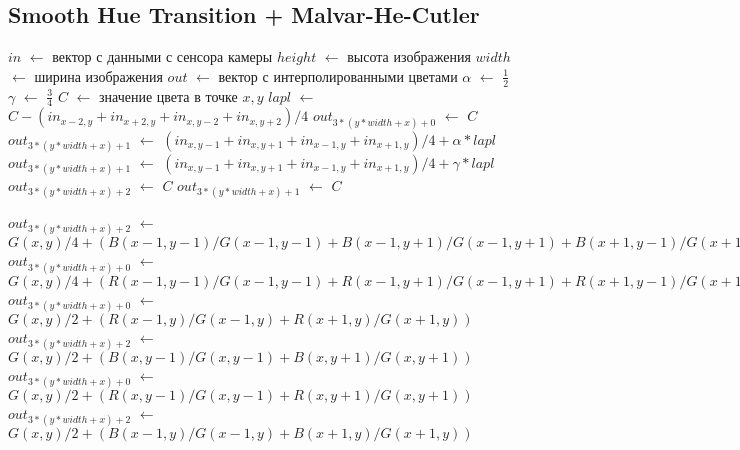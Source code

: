 \subsection{Smooth Hue Transition + Malvar-He-Cutler}
\begin{algorithm}[H]
	\caption{Smooth Hue Transition + Malvar-He-Cutler}
	\label{alg:mhc1}
	\begin{algorithmic}[1]
		\State $in$ $\gets$ вектор с данными с сенсора камеры
		\State $height$ $\gets$ высота изображения
		\State $width$ $\gets$ ширина изображения
		\State $out$ $\gets$ вектор с интерполированными цветами
		\State $\alpha$ $\gets$ $\frac{1}{2}$
		\State $\gamma$ $\gets$ $\frac{3}{4}$
		\State $C$ $\gets$ значение цвета в точке $x,y$
		\State $lapl$ $\gets$ $C - (in_{x-2, y} + in_{x+2, y} + in_{x, y-2} + in_{x, y+2}) / 4$
		\State $out_{3 * (y * width + x) + 0}$ $\gets$ $C$
		\State $out_{3 * (y * width + x) + 1}$ $\gets$ $(in_{x, y-1} + in_{x, y + 1} + in_{x - 1, y} + in_{x + 1, y}) / 4 + \alpha * lapl$
		\EndIf
		\State $out_{3 * (y * width + x) + 1}$ $\gets$ $(in_{x, y-1} + in_{x, y + 1} + in_{x - 1, y} + in_{x + 1, y}) / 4 + \gamma * lapl$
		\State $out_{3 * (y * width + x) + 2}$ $\gets$ $C$
		\EndIf
		\State $out_{3 * (y * width + x) + 1}$ $\gets$ $C$
		\EndIf
		\EndFor
		\EndFor
	\end{algorithmic}
\end{algorithm}
\clearpage
\begin{algorithm}
	\begin{algorithmic}[1]
		\State $out_{3 * (y * width + x) + 2}$ $\gets$ $G(x,y)/4 + (
		B(x-1,y-1)/G(x-1,y-1) +
		B(x-1,y+1)/G(x-1,y+1) +
		B(x+1,y-1)/G(x+1,y-1) +
		B(x+1,y+1)/G(x+1,y+1)
		)$
		\EndIf
		\State $out_{3 * (y * width + x) + 0}$ $\gets$ $G(x,y)/4 + (
		R(x-1,y-1)/G(x-1,y-1) +
		R(x-1,y+1)/G(x-1,y+1) +
		R(x+1,y-1)/G(x+1,y-1) +
		R(x+1,y+1)/G(x+1,y+1)
		)$
		\EndIf
		\State $out_{3 * (y * width + x) + 0}$ $\gets$ $G(x,y)/2 + (
		R(x-1,y)/G(x-1,y) +
		R(x+1,y)/G(x+1,y)
		)$
		\State $out_{3 * (y * width + x) + 2}$ $\gets$ $G(x,y)/2 + (
		B(x,y-1)/G(x,y-1) +
		B(x,y+1)/G(x,y+1)
		)$
		\EndIf
		\State $out_{3 * (y * width + x) + 0}$ $\gets$ $G(x,y)/2 + (
		R(x,y-1)/G(x,y-1) +
		R(x,y+1)/G(x,y+1)
		)$
		\State $out_{3 * (y * width + x) + 2}$ $\gets$ $G(x,y)/2 + (
		B(x-1,y)/G(x-1,y) +
		B(x+1,y)/G(x+1,y)
		)$
		\EndIf
		\EndFor
		\EndFor
	\end{algorithmic}
\end{algorithm}
\clearpage

